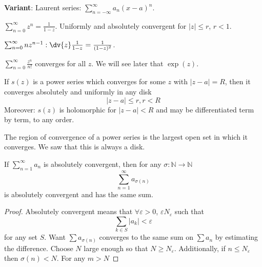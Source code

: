 \documentclass{report}
\begin{document}
\textbf{Variant}: Laurent series: $\sum_{n =  - \infty}^{\infty}a_{n}(x - a)^{n}$.

\begin{examples}
    \begin{example}
        $\sum_{n = 0}^{\infty}z^{n} = \frac{1}{1 - z}$. Uniformly and absolutely convergent for $\lvert z \rvert \leq r$, $r < 1$.
    \end{example}
    \begin{example}
        $\sum_{n = 0}^{\infty}nz^{n - 1}: \dv{z}\frac{1}{1 - z} = \frac{1}{(1 - z)^{2}}$.
    \end{example}
    \begin{example}
        $\sum_{n = 0}^{\infty}\frac{z^{n}}{n!}$ converges for all $z$. We will see later that $\exp(z)$.
    \end{example}
\end{examples}

\begin{theorem}{}
    If $s(z)$ is a power series which converges for some $z$ with $\lvert  z - a \rvert = R$, then it converges absolutely and uniformly in any disk 
        \begin{equation*}
            \lvert z - a \rvert \leq r, r < R
        \end{equation*}
    Moreover: $s(z)$ is holomorphic for $\lvert z - a \rvert < R$ and may be differentiated term by term, to any order.
\end{theorem}

\begin{definition}{}
    The region of convergence of a power series is the largest open set in which it converges. We saw that this is always a disk.
\end{definition}

\begin{theorem}{}
    If $\sum_{n = 1}^{\infty}a_{n}$ is absolutely convergent, then for any $\sigma : \mathbb{N} \rightarrow \mathbb{N}$
        \begin{equation*}
            \sum_{n = 1}^{\infty}a_{\sigma(n)}
        \end{equation*}
    is absolutely convergent and has the same sum.
\end{theorem}
    \begin{proof}
        Absolutely convergent means that $\forall \varepsilon > 0$, $\varepsilon N_{\varepsilon}$ such that 
            \begin{equation*}
                \sum_{k \in S} \lvert a_{k} \rvert < \varepsilon
            \end{equation*}
        for any set $S$. Want $\sum a_{\sigma(n)}$ converges to the same sum on $\sum a_{n}$ by estimating the difference. Choose $N$ large enough so that $N \geq N_{\varepsilon}$. Additionally, if $n \leq N_{\varepsilon}$ then $\sigma(n) < N$. For any $m > N$
    \end{proof}
\end{document}

